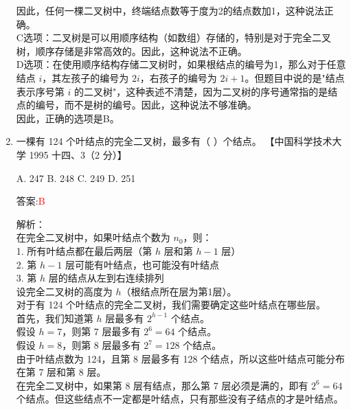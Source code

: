 \documentclass[lang=cn,newtx,10pt,scheme=chinese]{../../../elegantbook}
\begin{document}
\begin{enumerate}
    因此，任何一棵二叉树中，终端结点数等于度为2的结点数加1，这种说法正确。\\
    
    C选项：二叉树是可以用顺序结构（如数组）存储的，特别是对于完全二叉树，顺序存储是非常高效的。因此，这种说法不正确。\\
    
    D选项：在使用顺序结构存储二叉树时，如果根结点的编号为1，那么对于任意结点 $i$，其左孩子的编号为 $2i$，右孩子的编号为 $2i+1$。但题目中说的是"结点表示序号第 $i$ 的二叉树"，这种表述不清楚，因为二叉树的序号通常指的是结点的编号，而不是树的编号。因此，这种说法不够准确。\\
    
    因此，正确的选项是B。\\  

    \item 一棵有 124 个叶结点的完全二叉树，最多有（ ）个结点。  
    【中国科学技术大学 1995 十四、3（2 分）】  

    A. 247 \quad B. 248 \quad C. 249 \quad D. 251  
    
    答案:\textcolor{red}{B}
    
    解析：\\
    在完全二叉树中，如果叶结点个数为 $n_0$，则：\\
    1. 所有叶结点都在最后两层（第 $h$ 层和第 $h-1$ 层）\\
    2. 第 $h-1$ 层可能有叶结点，也可能没有叶结点\\
    3. 第 $h$ 层的结点从左到右连续排列\\
    
    设完全二叉树的高度为 $h$（根结点所在层为第1层）。\\
    
    对于有 124 个叶结点的完全二叉树，我们需要确定这些叶结点在哪些层。\\
    
    首先，我们知道第 $h$ 层最多有 $2^{h-1}$ 个结点。\\
    
    假设 $h = 7$，则第 7 层最多有 $2^6 = 64$ 个结点。\\
    假设 $h = 8$，则第 8 层最多有 $2^7 = 128$ 个结点。\\
    
    由于叶结点数为 124，且第 8 层最多有 128 个结点，所以这些叶结点可能分布在第 7 层和第 8 层。\\
    
    在完全二叉树中，如果第 8 层有结点，那么第 7 层必须是满的，即有 $2^6 = 64$ 个结点。但这些结点不一定都是叶结点，只有那些没有子结点的才是叶结点。\\
    

\end{enumerate}
\end{document}
